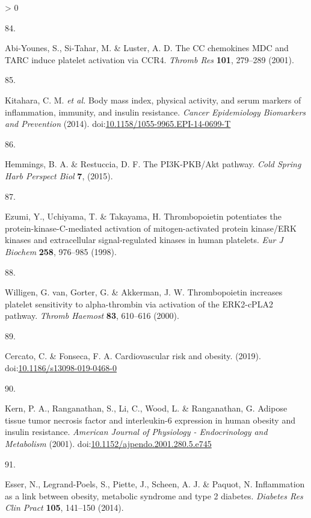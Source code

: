 \documentclass[11pt,twoside]{bristolthesis}
\newlength{\cslhangindent}
\newlength{\csllabelwidth}
\newenvironment{CSLReferences}[2] %
 {%
  \setlength{\parindent}{0pt}
  \ifodd #1 \everypar{\setlength{\hangindent}{\cslhangindent}}\ignorespaces\fi
  \ifnum #2 > 0
  \setlength{\parskip}{#2\baselineskip}
  \fi
 }%
 {}
\newcommand{\CSLLeftMargin}[1]{\parbox[t]{\csllabelwidth}{#1}}
\newcommand{\CSLRightInline}[1]{\parbox[t]{\linewidth - \csllabelwidth}{#1}\break}
\begin{document}
\begin{CSLReferences}{0}{0}
\leavevmode\hypertarget{ref-Abi-Younes2001}{}%
\CSLLeftMargin{84. }
\CSLRightInline{Abi-Younes, S., Si-Tahar, M. \& Luster, A. D. {The CC chemokines MDC and TARC induce platelet activation via CCR4}. \emph{Thromb Res} \textbf{101}, 279--289 (2001).}

\leavevmode\hypertarget{ref-Kitahara2014}{}%
\CSLLeftMargin{85. }
\CSLRightInline{Kitahara, C. M. \emph{et al.} {Body mass index, physical activity, and serum markers of inflammation, immunity, and insulin resistance}. \emph{Cancer Epidemiology Biomarkers and Prevention} (2014). doi:\href{https://doi.org/10.1158/1055-9965.EPI-14-0699-T}{10.1158/1055-9965.EPI-14-0699-T}}

\leavevmode\hypertarget{ref-Hemmings2015}{}%
\CSLLeftMargin{86. }
\CSLRightInline{Hemmings, B. A. \& Restuccia, D. F. {The PI3K-PKB/Akt pathway}. \emph{Cold Spring Harb Perspect Biol} \textbf{7}, (2015).}

\leavevmode\hypertarget{ref-Ezumi1998}{}%
\CSLLeftMargin{87. }
\CSLRightInline{Ezumi, Y., Uchiyama, T. \& Takayama, H. {Thrombopoietin potentiates the protein-kinase-C-mediated activation of mitogen-activated protein kinase/ERK kinases and extracellular signal-regulated kinases in human platelets}. \emph{Eur J Biochem} \textbf{258}, 976--985 (1998).}

\leavevmode\hypertarget{ref-VanWilligen2000}{}%
\CSLLeftMargin{88. }
\CSLRightInline{Willigen, G. van, Gorter, G. \& Akkerman, J. W. {Thrombopoietin increases platelet sensitivity to alpha-thrombin via activation of the ERK2-cPLA2 pathway}. \emph{Thromb Haemost} \textbf{83}, 610--616 (2000).}

\leavevmode\hypertarget{ref-Cercato2019}{}%
\CSLLeftMargin{89. }
\CSLRightInline{Cercato, C. \& Fonseca, F. A. {Cardiovascular risk and obesity}. (2019). doi:\href{https://doi.org/10.1186/s13098-019-0468-0}{10.1186/s13098-019-0468-0}}

\leavevmode\hypertarget{ref-Kern2001}{}%
\CSLLeftMargin{90. }
\CSLRightInline{Kern, P. A., Ranganathan, S., Li, C., Wood, L. \& Ranganathan, G. {Adipose tissue tumor necrosis factor and interleukin-6 expression in human obesity and insulin resistance}. \emph{American Journal of Physiology - Endocrinology and Metabolism} (2001). doi:\href{https://doi.org/10.1152/ajpendo.2001.280.5.e745}{10.1152/ajpendo.2001.280.5.e745}}

\leavevmode\hypertarget{ref-Esser2014}{}%
\CSLLeftMargin{91. }
\CSLRightInline{Esser, N., Legrand-Poels, S., Piette, J., Scheen, A. J. \& Paquot, N. {Inflammation as a link between obesity, metabolic syndrome and type 2 diabetes}. \emph{Diabetes Res Clin Pract} \textbf{105}, 141--150 (2014).}


\end{CSLReferences}
\end{document}
